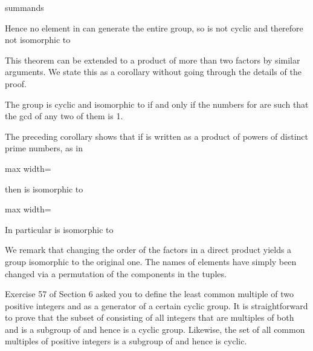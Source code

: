\documentclass[11pt,oneside]{article}
\begin{document}
\begin{BookBody}
 summands

Hence no element  in  can generate the entire group, so  is not cyclic and therefore not isomorphic to \BookEnd{\blacklozenge}

This theorem can be extended to a product of more than two factors by similar arguments. We state this as a corollary without going through the details of the proof.

 The group  is cyclic and isomorphic to  if and only if the numbers  for  are such that the gcd of any two of them is 1.

 The preceding corollary shows that if  is written as a product of powers of distinct prime numbers, as in

\begin{center}\begin{adjustbox}{max width=\linewidth}\end{adjustbox}\end{center}

\noindent then  is isomorphic to

\begin{center}\begin{adjustbox}{max width=\linewidth}\end{adjustbox}\end{center}

In particular is isomorphic to  \BookEnd{\blacktriangle}

We remark that changing the order of the factors in a direct product yields a group isomorphic to the original one. The names of elements have simply been changed via a permutation of the components in the tuples.

Exercise 57 of Section 6 asked you to define the least common multiple of two positive integers  and  as a generator of a certain cyclic group. It is straightforward to prove that the subset of  consisting of all integers that are multiples of both  and  is a subgroup of  and hence is a cyclic group. Likewise, the set of all common multiples of  positive integers  is a subgroup of  and hence is cyclic.


\end{BookBody}
\end{document}
